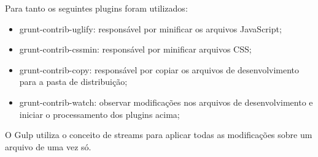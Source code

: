 Para tanto os seguintes plugins foram utilizados:

\begin{itemize}
    \item grunt-contrib-uglify: responsável por minificar os arquivos JavaScript;
    \item grunt-contrib-cssmin: responsável por minificar arquivos CSS;
    \item grunt-contrib-copy: responsável por copiar os arquivos de desenvolvimento para a pasta de distribuição;
    \item grunt-contrib-watch: observar modificações nos arquivos de desenvolvimento e iniciar o processamento dos plugins acima;
\end{itemize}

O Gulp utiliza o conceito de streams para aplicar todas as modificações sobre
um arquivo de uma vez só.



